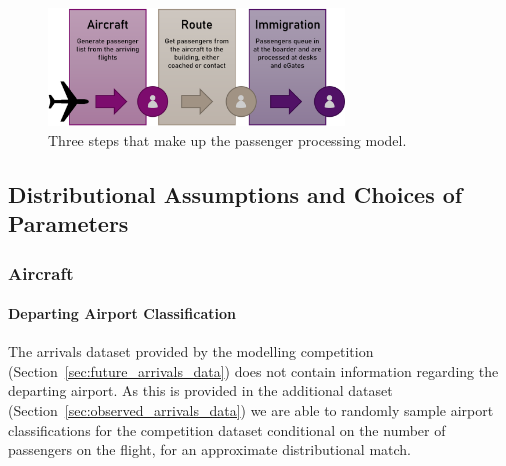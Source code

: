 \documentclass[10pt]{article}
\begin{document}
\begin{figure}[!ht]
    \centering
    \includegraphics[width=0.7\textwidth]{figures/ThreeSteps.png}
     \caption{Three steps that make up the passenger processing model.  } \label{fig:PPM_threesteps}
\end{figure}

\subsection{Distributional Assumptions and Choices of Parameters}

\subsubsection{Aircraft}

\paragraph{Departing Airport Classification}
The arrivals dataset provided by the modelling competition (Section~\ref{sec:future_arrivals_data}) does not contain information regarding the departing airport. As this is provided in the additional dataset (Section~\ref{sec:observed_arrivals_data}) we are able to randomly sample airport classifications for the competition dataset conditional on the number of passengers on the flight, for an approximate distributional match. 



\end{document}
